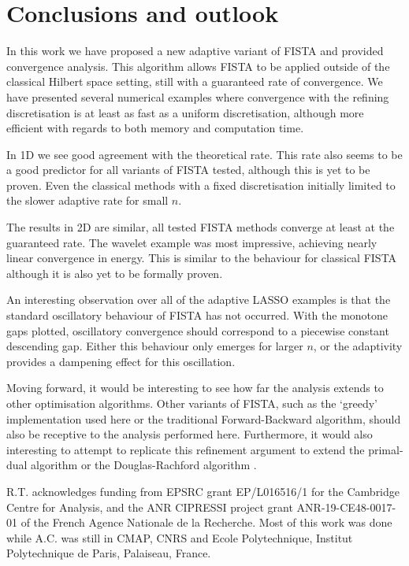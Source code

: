 \documentclass[smallextended]{svjour3}
\newcommand{\1}{\F{1}}
\newcommand{\edit}[3][1]{%
	\IfEq{#1}{2}{\def\mysecondvar{}}{\def\mysecondvar{#2}}%
	\ifx\mysecondvar\empty{}\else{%
		\IfEq{#1}{1}{%
			\ifmmode%
			\text{\color{red}\sout{\ensuremath{#2}}}%
			\else%
			{\color{red} \sout{#2}}%
			\fi%
		}{\color{red}#2}\ %
	}\fi{\color{darkgreen}#3}}
\begin{document}
	\section{Conclusions and outlook}
	In this work we have proposed a new adaptive variant of FISTA and provided convergence analysis. This algorithm allows FISTA to be applied outside of the classical Hilbert space setting, still with a guaranteed rate of convergence. We have presented several numerical examples where convergence with the refining discretisation is at least as fast as a uniform discretisation, although more efficient with regards to both memory and computation time. 
	
	In 1D we see good agreement with the theoretical rate. This rate also seems to be a good predictor for all variants of FISTA tested, although this is yet to be proven. Even the classical methods with a fixed discretisation\edit{}{ are} initially\edit{ seem}{} limited to the slower adaptive rate for small $n$.
	
	The results in 2D are similar, all tested FISTA methods converge at least at the guaranteed rate. The wavelet example was most impressive, achieving nearly linear convergence in energy. This is similar to the behaviour for classical FISTA although it is also yet to be formally proven.
	
	An interesting observation over all of the adaptive LASSO examples is that the standard oscillatory behaviour of FISTA has not occurred. With the monotone gaps plotted, oscillatory convergence should correspond to a piecewise constant descending gap. Either this behaviour only emerges for larger $n$, or the adaptivity provides a dampening effect for this oscillation.
	
	Moving forward, it would be interesting to see how far the analysis extends to other optimisation algorithms. Other variants of FISTA, such as the `greedy' implementation used here or the traditional Forward-Backward algorithm, should also be receptive to the analysis performed here. Furthermore, it would also interesting to attempt to replicate this refinement argument to extend the primal-dual algorithm \cite{Chambolle2011} or the Douglas-Rachford algorithm \cite{Douglas1956}.
	
	\begin{acknowledgements}
		R.T. acknowledges funding from EPSRC grant EP/L016516/1 for the Cambridge Centre for Analysis, and the ANR CIPRESSI project grant ANR-19-CE48-0017-01 of the French Agence Nationale de la Recherche. Most of this work was done while A.C. was still in CMAP, CNRS and Ecole Polytechnique, Institut Polytechnique de Paris, Palaiseau, France.
	\end{acknowledgements}
\end{document}
